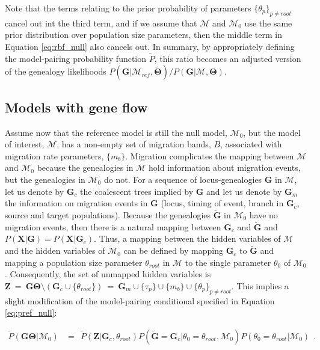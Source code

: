 \documentclass[11pt]{article}
\newcommand{\vect}[1]{\boldsymbol{\mathbf{#1}}}
\newcommand{\X}{\vect{X}}
\newcommand{\M}{\mathcal{M}}
\newcommand{\G}{\vect{G}}
\newcommand{\T}{\vect{\Theta}}
\newcommand{\GT}{\G\T}
\newcommand{\Mref}{\M_{ref}}
\newcommand{\Pref}{\widetilde{P}}
\newcommand{\Gref}{\widetilde{\G}}
\newcommand{\Tref}{\widetilde{\T}}
\newcommand{\Z}{\vect{Z}}
\newcommand{\troot}{\theta_{root}}
\newcommand{\Gc}{\G_c}
\newcommand{\Gm}{\G_m}
\begin{document}
Note that the terms relating to the prior probability of parameters $\{\theta_p\}_{p\neq root}$ cancel out int the third term,
and  if we assume that $\M$ and $\M_0$ use the same prior distribution over population size parameters,
then the middle term in Equation \ref{eq:rbf_null} also cancels out.
%
In summary, by appropriately defining the model-pairing probability function $\Pref$, this ratio
becomes an adjusted version of the genealogy likelihoods $P(\G|\Mref,\Tref)/P(\G|\M,\T)$. 



\subsection*{Models with gene flow}

Assume now that the reference model is still the null model, $\M_0$, but the model of interest, $\M$, has a non-empty
set of migration bands, $B$, associated with migration rate parameters, $\{m_b\}$.
%
Migration complicates the mapping between $\M$ and $\M_0$ because the genealogies in $\M$ hold information
about migration events, but the genealogies in $\M_0$ do not.
%
For a sequence of locus-genealogies $\G$ in $\M$, let us denote by $\Gc$ the coalescent trees implied by $\G$
and let us denote by $\Gm$ the information on migration events in $\G$ (locus, timing of event, branch in $\Gc$, source and target populations).
%
Because the genealogies $\Gref$ in $\M_0$ have no migration events, then there is a natural mapping between $\Gc$ and $\Gref$ and $P(\X|\G) = P(\X|\Gc)$.
Thus, a mapping between the hidden variables of $\M$ and the hidden variables of $\M_0$ can be defined by
mapping $\Gc$ to $\Gref$ and mapping a population size parameter $\troot$ in $\M$ to the single parameter $\theta_0$
of $\M_0$.
%
Consequently, the set of unmapped hidden variables is $\Z~=~\GT\setminus(\Gc\cup\{\troot\})~=~ \Gm\cup\{\tau_p\}\cup\{m_b\}\cup\{\theta_p\}_{p\neq root}$.
%
This implies a slight modification of the model-pairing conditional specified in Equation \ref{eq:pref_null}:
%
%
\begin{small}
\begin{align}
 \Pref(\GT|\M_0)
 &=~~ 
 \Pref(\Z|\Gc,\troot) P(\Gref=\Gc|\theta_0=\troot,\M_0) P(\theta_0=\troot|\M_0)\ ~ .\label{eq:pref_mig}
\end{align}
\end{small}
\end{document}
